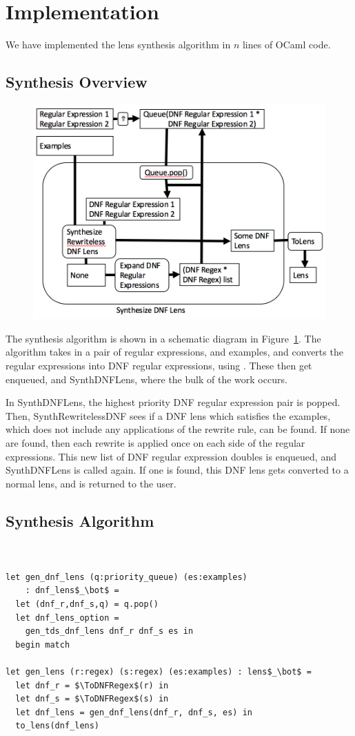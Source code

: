 \section{Implementation}
We have implemented the lens synthesis algorithm in $n$ lines of OCaml code.

\subsection{Synthesis Overview}
\begin{figure}
\includegraphics[scale=.5]{synth-lens-schematic.png}
\label{fig:synth-lens-schematic}
\end{figure}
The synthesis algorithm is shown in a schematic diagram in 
Figure~\ref{fig:synth-lens-schematic}.  The algorithm takes in a pair of
regular expressions, and examples, and converts the regular expressions into
DNF regular expressions, using \ToDNFRegex{}.
These then get enqueued, and SynthDNFLens, where the bulk of the work
occurs.

In SynthDNFLens, the highest priority DNF regular expression pair is popped.
Then, SynthRewritelessDNF sees if a DNF lens which satisfies the examples, which
does not include any applications of the rewrite rule, can be found.
If none are found, then each rewrite is applied once on each side of the regular
expressions.
This new list of DNF regular expression doubles is enqueued, and SynthDNFLens is
called again.
If one is found, this DNF lens gets converted to a normal lens, and is returned
to the user.

\subsection{Synthesis Algorithm}
\begin{lstlisting}[mathescape]


let gen_dnf_lens (q:priority_queue) (es:examples)
    : dnf_lens$_\bot$ =
  let (dnf_r,dnf_s,q) = q.pop()
  let dnf_lens_option =
    gen_tds_dnf_lens dnf_r dnf_s es in
  begin match 

let gen_lens (r:regex) (s:regex) (es:examples) : lens$_\bot$ =
  let dnf_r = $\ToDNFRegex$(r) in
  let dnf_s = $\ToDNFRegex$(s) in
  let dnf_lens = gen_dnf_lens(dnf_r, dnf_s, es) in
  to_lens(dnf_lens)
\end{lstlisting}
